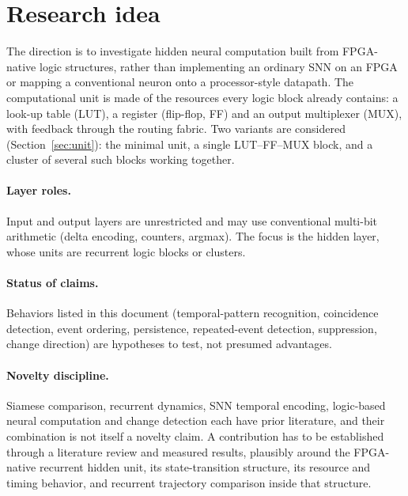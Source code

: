 \section{Research idea}
\label{sec:idea}
The direction is to investigate hidden neural computation built from FPGA-native logic structures, rather than implementing an ordinary SNN on an FPGA or mapping a conventional neuron onto a processor-style datapath. The computational unit is made of the resources every logic block already contains: a look-up table (LUT), a register (flip-flop, FF) and an output multiplexer (MUX), with feedback through the routing fabric. Two variants are considered (Section~\ref{sec:unit}): the minimal unit, a single LUT--FF--MUX block, and a cluster of several such blocks working together.

\paragraph{Layer roles.} Input and output layers are unrestricted and may use conventional multi-bit arithmetic (delta encoding, counters, argmax). The focus is the hidden layer, whose units are recurrent logic blocks or clusters.

\paragraph{Status of claims.} Behaviors listed in this document (temporal-pattern recognition, coincidence detection, event ordering, persistence, repeated-event detection, suppression, change direction) are hypotheses to test, not presumed advantages.

\paragraph{Novelty discipline.} Siamese comparison, recurrent dynamics, SNN temporal encoding, logic-based neural computation and change detection each have prior literature, and their combination is not itself a novelty claim. A contribution has to be established through a literature review and measured results, plausibly around the FPGA-native recurrent hidden unit, its state-transition structure, its resource and timing behavior, and recurrent trajectory comparison inside that structure. 

